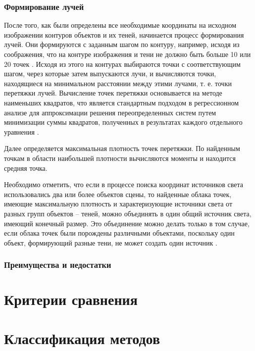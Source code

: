 \subsubsection*{Формирование лучей}

После того, как были определены все необходимые координаты на исходном изображении контуров объектов и их теней, начинается процесс формирования лучей. Они формируются с заданным шагом по контуру, например, исходя из соображения, что на контуре изображения и тени не должно быть больше 10 или 20 точек \cite{sns_tras}. Исходя из этого на контурах выбираются точки с соответствующим шагом, через которые затем выпускаются лучи, и вычисляются точки, находящиеся на минимальном расстоянии между этими лучами, т. е. точки перетяжки лучей. Вычисление точек перетяжки основывается на методе наименьших квадратов, что является стандартным подходом в регрессионном анализе для аппроксимации решения переопределенных систем путем минимизации суммы квадратов, полученных в результатах каждого отдельного уравнения \cite{mnk}.

Далее определяется максимальная плотность точек перетяжки. По найденным точкам в области наибольшей плотности вычисляются моменты и находится средняя точка.

Необходимо отметить, что если в процессе поиска координат источников света использовались два или более объектов сцены, то найденные облака точек, имеющие максимальную плотность и характеризующие источники света от разных групп объектов – теней, можно объединять в один общий источник света, имеющий конечный размер. Это объединение можно делать только в том случае, если облака точек были порождены различными объектами, поскольку один объект, формирующий разные тени, не может создать один источник \cite{sns_tras}.

\subsubsection*{Преимущества и недостатки}

\section{Критерии сравнения}

\section{Классификация методов}